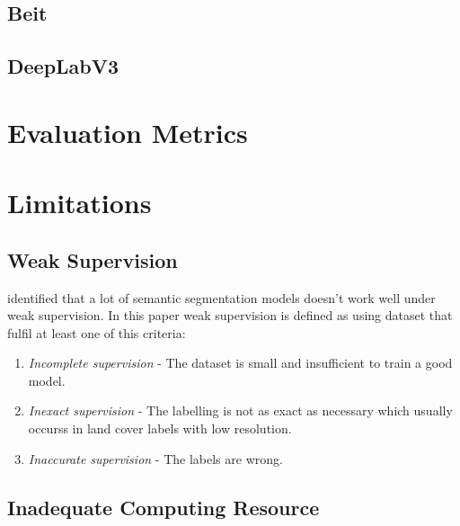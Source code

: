 \subsection{Beit}

\subsection{DeepLabV3}
\section{Evaluation Metrics}
\section{Limitations}

\subsection{Weak Supervision}
\cite{weakly-supervised-semantic} identified that a lot of semantic segmentation models doesn't work well under weak supervision. In this paper weak supervision is defined as using dataset that fulfil at least one of this criteria:
\begin{enumerate}
    \item \textit{Incomplete supervision} - The dataset is small and insufficient to train a good model.
    \item \textit{Inexact supervision} - The labelling is not as exact as necessary which usually occurss in land cover labels with low resolution.
    \item \textit{Inaccurate supervision} - The labels are wrong.
\end{enumerate}

\subsection{Inadequate Computing Resource}

